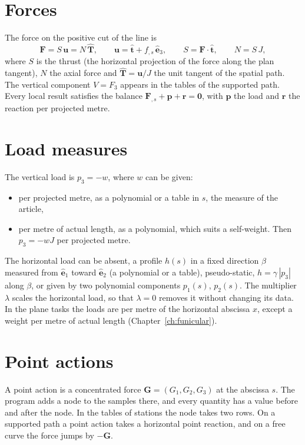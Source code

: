 \documentclass[fontsize=10.5pt,paper=a4,parskip=half,headings=normal,numbers=noenddot,
  open=any,bibliography=totoc,captions=tableheading]{scrreprt}
\numberwithin{figure}{chapter}
\numberwithin{table}{chapter}
\newcommand{\e}{\hat{\mathbf e}}
\newcommand{\F}{\mathbf F}
\newcommand{\G}{\mathbf G}
\newcommand{\T}{\hat{\mathbf T}}
\newcommand{\tv}{\hat{\mathbf t}}
\newcommand{\uv}{\mathbf u}
\newcommand{\pp}{\mathbf p}
\newcommand{\rr}{\mathbf r}
\begin{document}
\section{Forces}

The force on the positive cut of the line is
\begin{equation}
\F=S\,\uv=N\,\T,\qquad \uv=\tv+f_{,s}\,\e_3,\qquad S=\F\cdot\tv,\qquad N=S\,J,
\end{equation}
where $S$ is the thrust (the horizontal projection of the force along the plan tangent), $N$ the axial
force and $\T=\uv/J$ the unit tangent of the spatial path. The vertical component $V=F_3$ appears in the
tables of the supported path. Every local result satisfies the balance $\F_{,s}+\pp+\rr=\mathbf 0$, with
$\pp$ the load and $\rr$ the reaction per projected metre.

\section{Load measures}\label{sec:measure}

The vertical load is $p_3=-w$, where $w$ can be given:
\begin{itemize}
\item per projected metre, as a polynomial or a table in $s$, the measure of the article,
\item per metre of actual length, as a polynomial, which suits a self-weight. Then $p_3=-wJ$ per
projected metre.
\end{itemize}
The horizontal load can be absent, a profile $h(s)$ in a fixed direction $\beta$ measured from $\e_1$
toward $\e_2$ (a polynomial or a table), pseudo-static, $h=\gamma\,|p_3|$ along $\beta$, or given by two
polynomial components $p_1(s)$, $p_2(s)$. The multiplier $\lambda$ scales the horizontal load, so that
$\lambda=0$ removes it without changing its data. In the plane tasks the loads are per metre of the
horizontal abscissa $x$, except a weight per metre of actual length (Chapter~\ref{ch:funicular}).

\section{Point actions}

A point action is a concentrated force $\G=(G_1,G_2,G_3)$ at the abscissa $s$. The program adds a node
to the samples there, and every quantity has a value before and after the node. In the tables of
stations the node takes two rows. On a supported path a point action takes a horizontal point reaction,
and on a free curve the force jumps by $-\G$.
\end{document}
